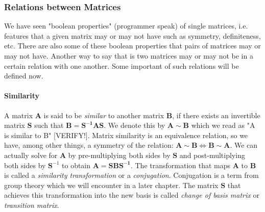 

\subsubsection{Relations between Matrices}
We have seen "boolean properties" (programmer speak) of single matrices, i.e. features that a given matrix may or may not have such as symmetry, definiteness, etc. There are also some of these boolean properties that pairs of matrices may or may not have. Another way to say that is two matrices may or may not be in a certain relation with one another. Some important of such relations will be defined now.


\paragraph{Similarity}
A matrix $\mathbf{A}$ is said to be \emph{similar} to another matrix $\mathbf{B}$, if there exists an invertible matrix $\mathbf{S}$ such that $\mathbf{B} = \mathbf{S^{-1} A S}$. We denote this by $\mathbf{A} \sim \mathbf{B}$ which we read as "A is similar to B" [VERIFY!]. Matrix similarity is an equivalence relation, so we have, among other things, a symmetry of the relation: $\mathbf{A} \sim \mathbf{B} \Leftrightarrow \mathbf{B} \sim \mathbf{A}$. We can actually solve for $\mathbf{A}$ by pre-multiplying both sides by $\mathbf{S}$ and post-multiplying both sides by $\mathbf{S}^{-1}$ to obtain $\mathbf{A} = \mathbf{S B S^{-1}}$. The transformation that maps $\mathbf{A}$ to $\mathbf{B}$ is called a \emph{similarity transformation} or a \emph{conjugation}. Conjugation is a term from group theory which we will encounter in a later chapter. The matrix $\mathbf{S}$ that achieves this transformation into the new basis is called \emph{change of basis matrix} or \emph{transition matrix}. 

